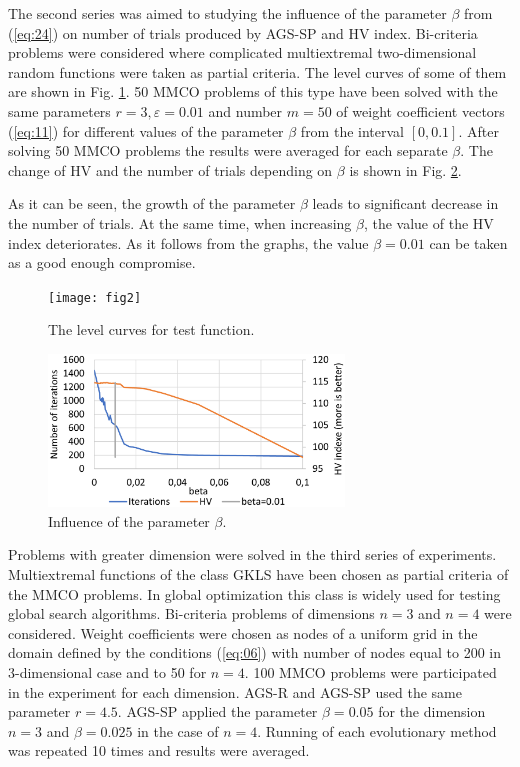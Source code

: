 \documentclass[runningheads]{llncs}
\begin{document}
The second series was aimed to studying the influence of the parameter $\beta$ from (\ref{eq:24}) on number of trials produced by AGS-SP and HV index. Bi-criteria problems were considered where complicated multiextremal two-dimensional random functions \cite{Grishagin2015_2} were taken as partial criteria. The level curves of some of them are shown in Fig.  \ref{fig:2}. 50 MMCO problems of this type have been solved with the same parameters $r=3, \varepsilon=0.01$ and number $m=50$ of weight coefficient vectors (\ref{eq:11}) for different values of the parameter $\beta$ from the interval $[0,0.1]$. After solving 50 MMCO problems the results were averaged for each separate $\beta$. The change of HV and the number of trials depending on $\beta$ is shown in Fig. \ref{fig:3}.

As it can be seen, the growth of the parameter $\beta$ leads to significant decrease in the number of trials. At the same time, when increasing $\beta$, the value of the HV index deteriorates. As it follows from the graphs, the value $\beta=0.01$ can be taken as a good enough compromise.

\begin{figure}
\centering
\texttt{[image: fig2]}
\caption{The level curves for test function.} \label{fig:2}
\end{figure}

\begin{figure}
\centering
\includegraphics[width=0.7\textwidth]{fig3}
\caption{Influence of the parameter $\beta$.} \label{fig:3}
\end{figure}

Problems with greater dimension were solved in the third series of experiments. Multiextremal functions of the class GKLS \cite{Gaviano2003} have been chosen as partial criteria of the MMCO problems.  In global optimization this class is widely used for testing global search algorithms. Bi-criteria problems of dimensions $n=3$ and $n=4$ were considered. Weight coefficients were chosen as nodes of a uniform grid in the domain defined by the conditions (\ref{eq:06}) with number of nodes equal to 200 in 3-dimensional case and to 50 for $n=4$. 100 MMCO problems were participated in the experiment for each dimension. AGS-R and AGS-SP used the same parameter $r=4.5$. AGS-SP applied the parameter $\beta=0.05$ for the dimension $n=3$ and $\beta=0.025$ in the case of $n=4$.  Running of each evolutionary method was repeated 10 times and results were averaged.   
\end{document}
